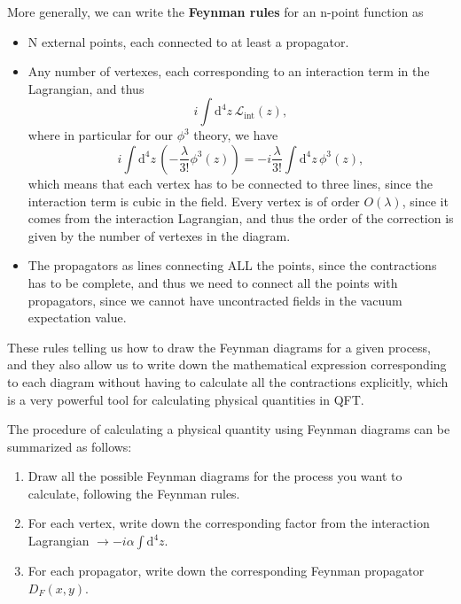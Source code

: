 More generally, we can write the \textbf{Feynman rules} for an n-point function as
\begin{itemize}
    \item N external points, each connected to at least a propagator.
    \item Any number of vertexes, each corresponding to an interaction term in the Lagrangian, and thus
          \[
              i \int \mathrm{d}^4 z \, \mathcal{L}_{\text{int}} (z),
          \]
          where in particular for our \(\phi^3\) theory, we have
          \[
              i \int \mathrm{d}^4 z \, (-\frac{\lambda}{3!} \phi^3 (z)) = -i \frac{\lambda}{3!} \int \mathrm{d}^4 z \, \phi^3 (z),
          \]
          which means that each vertex has to be connected to three lines, since the interaction term is cubic in the field. Every vertex is of order \(O(\lambda)\), since it comes from the interaction Lagrangian, and thus the order of the correction is given by the number of vertexes in the diagram.
    \item The propagators as lines connecting ALL the points, since the contractions has to be complete, and thus we need to connect all the points with propagators, since we cannot have uncontracted fields in the vacuum expectation value.
\end{itemize}
These rules telling us how to draw the Feynman diagrams for a given process, and they also allow us to write down the mathematical expression corresponding to each diagram without having to calculate all the contractions explicitly, which is a very powerful tool for calculating physical quantities in QFT.

The procedure of calculating a physical quantity using Feynman diagrams can be summarized as follows:
\begin{enumerate}
    \item Draw all the possible Feynman diagrams for the process you want to calculate, following the Feynman rules.
    \item For each vertex, write down the corresponding factor from the interaction Lagrangian \(\to  -i \alpha \int \mathrm{d}^4 z\).
    \item For each propagator, write down the corresponding Feynman propagator \(D_F (x,y)\).
\end{enumerate}

